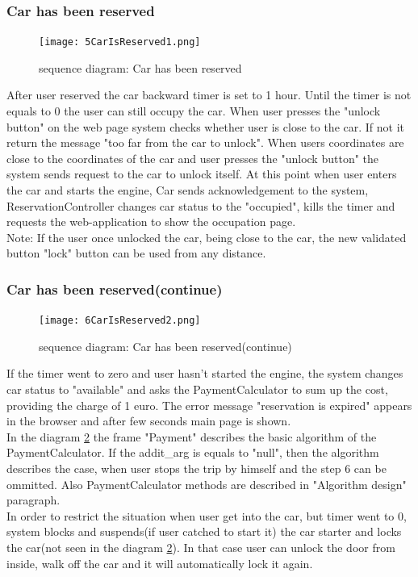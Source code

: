 \documentclass[12pt, letterpaper]{article}
\begin{document}
\subsubsection{Car has been reserved}
\begin{figure}[H]
\centering
\texttt{[image: 5CarIsReserved1.png]} 
\caption{sequence diagram: Car has been reserved}
\label{fig:5CarIsReserved1}
\end{figure}
\newpage
After user reserved the car backward timer is set to 1 hour. Until the timer is not equals to 0 the user can still occupy the car. When user presses the "unlock button" on the web page system checks whether user is close to the car. If not it return the message "too far from the car to unlock". When users coordinates are close to the coordinates of the car and user presses the "unlock button" the system sends request to the car to unlock itself. At this point when user enters the car and starts the engine, Car sends acknowledgement to the system, ReservationController changes car status to the "occupied", kills the timer and requests the web-application to show the occupation page. \\ 
Note: If the user once unlocked the car, being close to the car, the new validated button "lock" button can be used from any distance. \\
\newpage
\subsubsection{Car has been reserved(continue)}
\begin{figure}[H]
\centering
\texttt{[image: 6CarIsReserved2.png]}
\caption{sequence diagram: Car has been reserved(continue)} 
\label{fig:6CarIsReserved2}
\end{figure}
\newpage
If the timer went to zero and user hasn't started the engine, the system changes car status to "available" and asks the PaymentCalculator to sum up the cost, providing the charge of 1 euro. The error message "reservation is expired" appears in the browser and after few seconds main page is shown.  \\
In the diagram \ref{fig:6CarIsReserved2} the frame "Payment" describes the basic algorithm of the PaymentCalculator. If the addit\_arg is equals to "null", then the algorithm describes the case, when user stops the trip by himself and the step 6 can be ommitted. Also PaymentCalculator methods are described in "Algorithm design" paragraph. \\
In order to restrict the situation when user get into the car, but timer went to 0, system blocks and suspends(if user catched to start it) the car starter and locks the car(not seen in the diagram \ref{fig:6CarIsReserved2}). In that case user can unlock the door from inside, walk off the car and it will automatically lock it again.
\newpage
\end{document}
